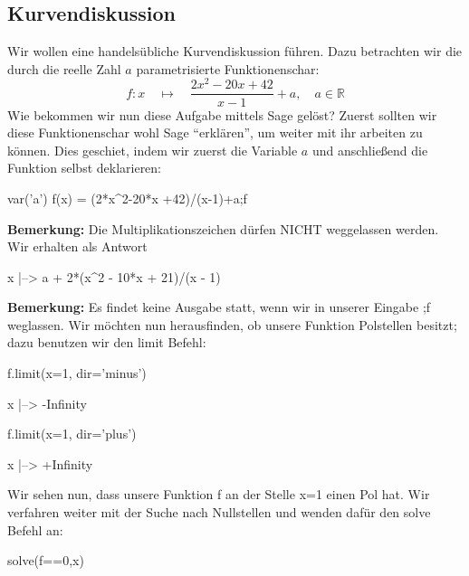 \documentclass[fontsize=12pt,paper=a4,twoside,bibtotoc,idxtotoc,
liststotoc,pagesize,BCOR1.2cm,DIV15,chapterprefix,pagesize=pdftex]{scrbook}
\begin{document}
\subsection{Kurvendiskussion}

Wir wollen eine handelsübliche Kurvendiskussion führen. Dazu betrachten wir die durch die reelle Zahl $a$ parametrisierte 
Funktionenschar:
\[ 
f: x \quad \mapsto \quad \frac{2x^2-20x+42}{x-1}+a, \quad
a \in \mathbb{R} 
\]
Wie bekommen wir nun diese Aufgabe mittels Sage gelöst? Zuerst sollten wir diese Funktionenschar wohl Sage ``erklären'', 
um weiter mit ihr arbeiten zu können. Dies geschiet, indem wir zuerst die Variable $a$ und anschließend die Funktion selbst 
deklarieren:\newline
\begin{sagein}
var('a')
f(x) = (2*x^2-20*x +42)/(x-1)+a;f
\end{sagein}
\textbf{Bemerkung:} Die Multiplikationszeichen dürfen NICHT weggelassen werden.\newline
Wir erhalten als Antwort\newline
\begin{sage}
  x |--> a + 2*(x^2 - 10*x + 21)/(x - 1)
\end{sage}
\textbf{Bemerkung:} Es findet keine Ausgabe statt, wenn wir in unserer Eingabe ;f weglassen.\newline
Wir möchten nun herausfinden, ob unsere Funktion Polstellen besitzt; dazu benutzen wir den limit Befehl:\newline
\begin{sagein}
f.limit(x=1, dir='minus')
\end{sagein}
\begin{sage}
  x |--> -Infinity
\end{sage}
\begin{sagein}
f.limit(x=1, dir='plus') 
\end{sagein}
\begin{sage}
  x |--> +Infinity
\end{sage}
Wir sehen nun, dass unsere Funktion f an der Stelle x=1 einen Pol hat. Wir verfahren weiter mit der Suche nach Nullstellen 
und wenden dafür den solve Befehl an:\newline
\begin{sagein}
solve(f==0,x)
\end{sagein}
\begin{sage}
[x == -1/4*a - 1/4*sqrt(a^2 - 32*a + 64) + 5, x == -1/4*a + 1/4*sqrt(a^2 - 32*a + 64) + 5]
\end{sage}
\end{document}
